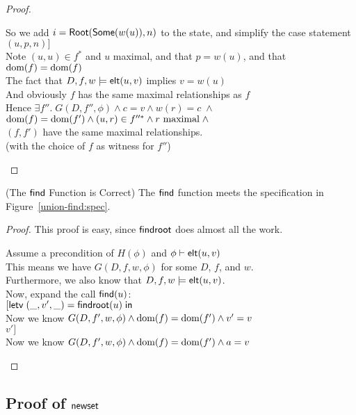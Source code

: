 \begin{proof}
\begin{tabbedproof}
\oooo So we add $i = \mathsf{Root}(\mathsf{Some}(w(u)), n)$ to the state, and simplify the case statement \\
\oooo $(u, p, n)]$\\
\oooo Note $(u, u) \in f^*$ and $u$ maximal, and that $p = w(u)$, and that $\mbox{dom}({f}) = \mbox{dom}({f})$ \\
\oooo The fact that $D, f, w \models \mathsf{elt}({u}, {v})$ implies $v = w(u)$\\ 
\oooo And obviously $f$ has the same maximal relationships as $f$ \\
\oooo Hence $\exists f''.\;G(D, f'', \phi) \land c = v \land w(r) = c \;\land$ \\
\oooox $\mbox{dom}({f}) = \mbox{dom}({f'}) \land (u,r) \in f''^{*} \land r\mbox{ maximal} \;\land$ \\
\oooox $(f,f')$ have the same maximal relationships. \\
\oooo (with the choice of $f$ as witness for $f''$) \\
\end{tabbedproof}
\end{proof}

\begin{lemma}{(The $\mathsf{find}$ Function is Correct)}
  The $\mathsf{find}$ function meets the specification in Figure~\ref{union-find:spec}. 
\end{lemma}

\begin{proof}
This proof is easy, since $\mathsf{findroot}$ does almost all the work.
\begin{tabbedproof}
\oo Assume a precondition of $H(\phi)$ and ${\phi} \vdash \mathsf{elt}({u}, {v})$ \\
\ooo This means we have $G(D, f, w, \phi)$ for some $D$, $f$, and $ w$. \\
\ooo Furthermore, we also know that $D, f, w \models \mathsf{elt}({u}, {v})$. \\
\ooo Now, expand the call $\mathsf{find}(u)$: \\
\ooo $[\mathsf{letv}\;(\_, v', \_) = \mathsf{findroot}(u)\;\mathsf{in}\;$ \\
\ooo Now we know $G(D, f', w, \phi) \land \mbox{dom}({f}) = \mbox{dom}({f'}) \land v' = v$ \\
\ooo $v']$ \\
\ooo Now we know $G(D, f', w, \phi) \land \mbox{dom}({f}) = \mbox{dom}({f'}) \land a = v$ 
\end{tabbedproof}
\end{proof}

\subsection{Proof of $\mathsf{newset}$}

